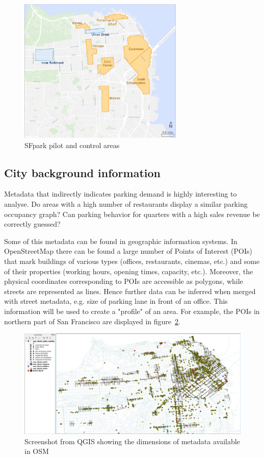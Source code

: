 \documentclass{article}
\begin{document}
\begin{large}
\begin{figure}[!ht]
    \centering
    \includegraphics[width=0.7\textwidth]{sfpark_areas.jpg}
    \caption{SFpark pilot and control areas}
    \label{fig:sfpark_areas}
\end{figure}

\subsection{City background information} 
Metadata that indirectly indicates parking demand is highly interesting to analyse. Do areas with a high number of restaurants display a similar parking occupancy graph? Can parking behavior for quarters with a high sales revenue be correctly guessed?

Some of this metadata can be found in geographic information systems. In OpenStreetMap there can be found a large number of Points of Interest (POIs) that mark buildings of various types (offices, restaurants, cinemas, etc.) and some of their properties (working hours, opening times, capacity, etc.). Moreover, the physical coordinates corresponding to POIs are accessible as polygons, while streets are represented as lines. Hence further data can be inferred when merged with street metadata, e.g. size of parking lane in front of an office. This information will be used to create a "profile" of an area. For example, the POIs in northern part of San Francisco are displayed in figure~\ref{fig:available_gis_data}. 

\begin{figure}[!ht]
    \centering
    \includegraphics[width=\textwidth]{available_gis_data.png}
    \caption{Screenshot from QGIS showing the dimensions of metadata available in OSM}
    \label{fig:available_gis_data}
\end{figure}


\end{large}
\end{document}
